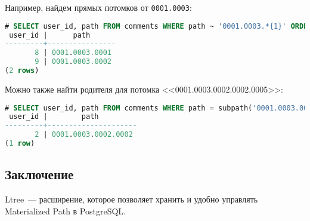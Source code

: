 Например, найдем прямых потомков от \lstinline!0001.0003!:

\begin{lstlisting}[language=SQL,label=lst:pgltree9,caption=Ltree]
# SELECT user_id, path FROM comments WHERE path ~ '0001.0003.*{1}' ORDER by path;
 user_id |      path
---------+----------------
       8 | 0001.0003.0001
       9 | 0001.0003.0002
(2 rows)
\end{lstlisting}

Можно также найти родителя для потомка <<0001.0003.0002.0002.0005>>:

\begin{lstlisting}[language=SQL,label=lst:pgltree10,caption=Ltree]
# SELECT user_id, path FROM comments WHERE path = subpath('0001.0003.0002.0002.0005', 0, -1) ORDER by path;
 user_id |        path
---------+---------------------
       2 | 0001.0003.0002.0002
(1 row)
\end{lstlisting}


\subsection{Заключение}

Ltree~--- расширение, которое позволяет хранить и удобно управлять Materialized Path в PostgreSQL.
